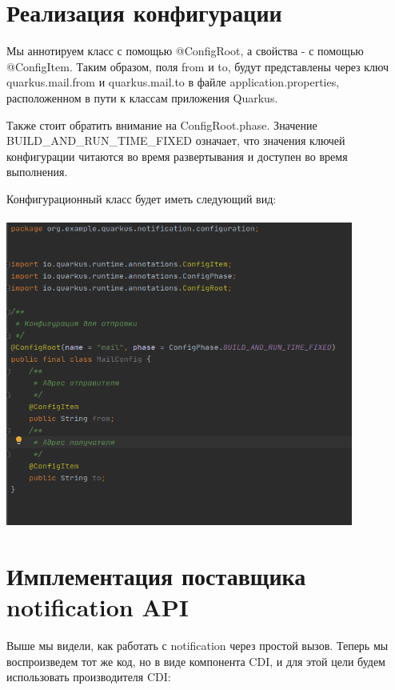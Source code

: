 \documentclass[russian,11pt]{article}
\begin{document}
\section{Реализация конфигурации}

Мы аннотируем класс с помощью @ConfigRoot, а свойства - с помощью @ConfigItem. Таким образом, поля from и to, будут представлены через ключ quarkus.mail.from и quarkus.mail.to в файле application.properties, расположенном в пути к классам приложения Quarkus.

	Также стоит обратить внимание на ConfigRoot.phase. Значение  BUILD\_AND\_RUN\_TIME\_FIXED означает, что значения ключей конфигурации читаются во время развертывания и доступен во время выполнения.
	
Конфигурационный класс будет иметь следующий вид:

\paragraph{\includegraphics[scale=0.5, width=\textwidth, height=10cm]{6}}

\section{Имплементация поставщика notification API}

Выше мы видели, как работать с notification через простой вызов. Теперь мы воспроизведем тот же код, но в виде компонента CDI, и для этой цели будем использовать производителя CDI:
\end{document}

